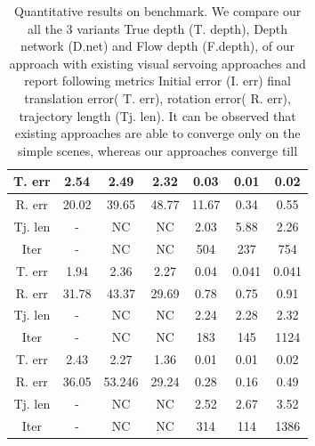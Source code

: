 \documentclass[letterpaper, 10 pt, conference]{ieeeconf}  %
\begin{document}
\begin{table}[h!]
\begin{center}
\begin{tabular}{|c|c|c|c|c|c|c|}
\hline \hline
T. err &2.54 & 2.49 & 2.32 & 0.03 & 0.01 & 0.02 \\\hline
R. err& 20.02 & 39.65 & 48.77 & 11.67 & 0.34 & 0.55 \\  \hline
 Tj. len & - & NC & NC  &  2.03  &  5.88  &  2.26  \\ \hline
 Iter& - & NC & NC  &  504  &  237  &  754  \\ \hline
\hline
T. err &1.94 & 2.36 & 2.27 & 0.04 & 0.041 & 0.041 \\ \hline
R. err& 31.78 & 43.37 & 29.69 & 0.78 & 0.75 & 0.91 \\  \hline
 Tj. len &  - & NC & NC  &  2.24  &  2.28  &  2.32  \\ \hline
 Iter& - & NC & NC  &  183  &  145  & 1124  \\ \hline
\hline
T. err &2.43 & 2.27 & 1.36 & 0.01 & 0.01 & 0.02 \\ \hline
R. err& 36.05 & 53.246 & 29.24 & 0.28 & 0.16 & 0.49 \\  \hline
 Tj. len & - & NC & NC  &  2.52  &  2.67  &  3.52  \\ \hline
 Iter& - & NC & NC  &  314  &  114  &  1386  \\ \hline

      \end{tabular}
\caption{Quantitative results on benchmark. We compare our all the 3 variants True depth (T. depth), Depth network (D.net) and Flow depth (F.depth), of our approach with existing visual servoing approaches and report following metrics Initial error (I. err) final translation error( T. err), rotation error( R. err), trajectory length (Tj. len). It can be observed that existing approaches are able to converge only on the simple scenes, whereas our approaches converge till }
 \label{tbl:bench_quant}
 \end{center}
 \end{table}
\end{document}
